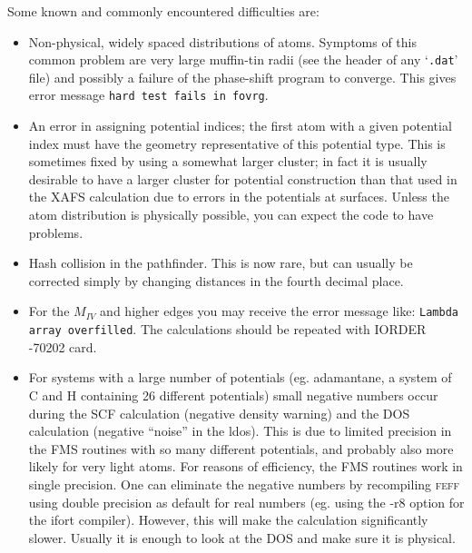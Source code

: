 \documentclass[11pt,oneside]{report} %
\newcommand{\program}[1]{\textsc{#1}}
\newcommand{\feff}{\program{feff}}
\newcommand{\file}[1]{`\texttt{#1}'}
\begin{document}
\begin{latexonly}
Some known and commonly encountered difficulties are:
\begin{itemize}
\item Non-physical, widely spaced distributions of atoms. Symptoms of
  this common problem are very large muffin-tin radii (see the header
  of any \file{.dat} file) and possibly a failure of the phase-shift
  program to converge. This gives error message \texttt{hard test
    fails in fovrg}.
\item An error in assigning potential indices; the first atom with a
  given potential index must have the geometry representative of this
  potential type. This is sometimes fixed by using a somewhat larger
  cluster; in fact it is usually desirable to have a larger cluster
  for potential construction than that used in the XAFS calculation
  due to errors in the potentials at surfaces. Unless the atom
  distribution is physically possible, you can expect the code to have
  problems.
\item Hash collision in the pathfinder. This is now rare, but can
  usually be corrected simply by changing distances in the fourth
  decimal place.
\item For the $M_{\mathit{IV}}$ and higher edges you may receive the
  error message like: \texttt{Lambda array overfilled}. The
  calculations should be repeated with IORDER -70202 card.
\item For systems with a large number of potentials (eg. adamantane,
  a system of C and H containing 26 different potentials) small negative numbers
  occur during the SCF calculation (negative density warning) and the DOS
  calculation (negative "`noise"' in the ldos).  This is due to limited precision 
  in the FMS routines with so many different potentials, and probably also more likely
  for very light atoms.  For reasons of efficiency, the FMS routines work in single
  precision.  One can eliminate the negative numbers by recompiling {\feff} using
  double precision as default for real numbers (eg. using the -r8 option for the ifort
  compiler).  However, this will make the calculation significantly slower.  Usually it is enough to look at the DOS and make sure it is physical.
\end{itemize}

\end{latexonly} %
\end{document}

